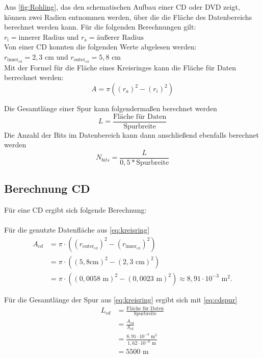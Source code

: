 \documentclass[9pt,twocolumn,twoside]{pnas-new}
\begin{document}
Aus \ref{fig:Rohling}, das den schematischen Aufbau einer CD oder DVD zeigt, können zwei Radien entnommen werden, über die die Fläche des Datenbereichs berechnet werden kann.
Für die folgenden Berechnungen gilt:  \begin{math} r_{\mbox{i}}  = \mbox{innerer Radius und } r_{\mbox{a}} = \mbox{äußerer Radius} \end{math} \\
Von einer CD konnten die folgenden Werte abgelesen werden: \begin{math} r_{\mbox{inner}_{\mbox{cd}}} = 2,3 \mbox{ cm und } r_{\mbox{outer}_{\mbox{cd}}} = 5,8 \mbox{ cm} \end{math} \\

Mit der Formel für die Fläche eines Kreisringes \cite[Seite 147]{Bartsch2014} kann die Fläche für Daten berrechnet werden: \begin{equation} \label{eq:kreisring} A = \pi((r_a)^2-(r_i)^2)  \end{equation} 

Die Gesamtlänge einer Spur kann folgendermaßen berechnet werden \begin{equation} \label{eq:gesamtlänge} L = \frac{\mbox{Fläche für Daten}}{\mbox{Spurbreite}} \end{equation}
Die Anzahl der Bits im Datenbereich kann dann anschließend ebenfalls berechnet werden \begin{equation} \label{eq:bitanzahl} N_{bits} = \frac{L}{0,5*\mbox{Spurbreite}} \end{equation}

\subsection{Berechnung CD}
Für eine CD ergibt sich folgende Berechnung: \\ \\
Für die genutzte Datenfläche aus \eqref{eq:kreisring}
\begin{align*}
 A_{cd} &= \pi\cdot((r_{\mbox{outer}_{\mbox{cd}}})^2-(r_{\mbox{inner}_{\mbox{cd}}})^2)\\	
&= \pi\cdot((5,8\mbox{cm})^2-(2,3\mbox{ cm})^2) \\
 &=  \pi\cdot((0,0058\mbox{ m})^2-(0,0023\mbox{ m})^2) \approx  8,91\cdot10^{-3}\mbox{ m}^2.
\end{align*}

Für die Gesamtlänge der Spur aus \eqref{eq:kreisring} ergibt sich mit \eqref{eq:cdspur}
\begin{align*}
 L_{cd} &= \frac{\mbox{Fläche für Daten}}{\mbox{Spurbreite}}\\
 &= \frac{A_{\mbox{cd}}}{S_{\mbox{cd}}}\\
 &= \frac{8,91\cdot10^{-3}\mbox{ m}^2}{1,62\cdot10^{-6}\mbox{ m} }\\
 &= 5500\mbox{ m}
\end{align*}
\end{document}
